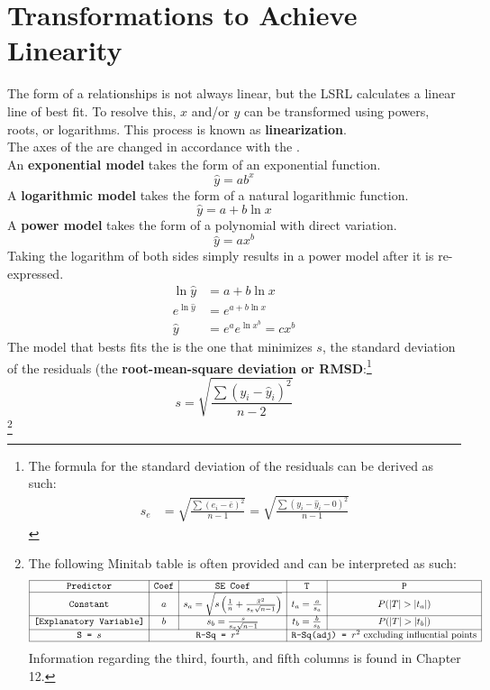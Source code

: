 \documentclass[../AP_Statistics.tex]{subfiles}
\begin{document}
		\section{Transformations to Achieve Linearity}
			The form of a relationships is not always linear, but the LSRL calculates a linear line of best fit. To resolve this, $x$ and/or $y$ can be transformed using powers, roots, or logarithms. This process is known as \textbf{linearization}. \\
			The axes of the  are changed in accordance with the . \\
			An \textbf{exponential model} takes the form of an exponential function.
			\[\hat{y} = ab^x\]
			A \textbf{logarithmic model} takes the form of a natural logarithmic function.
			\[\hat{y} = a + b\ln x\]
			A \textbf{power model} takes the form of a polynomial with direct variation.
			\[\hat{y} = ax^b\]
			Taking the logarithm of both sides simply results in a power model after it is re-expressed.
			\begin{align*}
				\ln \hat{y} &= a + b\ln x \\
				e^{\ln \hat{y}} &= e^{a + b\ln x} \\
				\hat{y} &= e^a e^{\ln x^b} = cx^b
			\end{align*}
			The model that bests fits the  is the one that minimizes $s$, the standard deviation of the residuals (the \textbf{root-mean-square deviation or RMSD}:\footnote{The formula for the standard deviation of the residuals can be derived as such:
				\begin{align*}
					s_e &= \sqrt{\frac{\sum(e_i - \bar{e})^2}{n - 1}} = \sqrt{\frac{\sum(y_i - \hat{y}_i - 0)^2}{n - 1}}
				\end{align*}
			}
			\[s = \sqrt{\frac{\sum(y_i - \hat{y}_i)^2}{n - 2}}\]
			\footnote{
				The following Minitab table is often provided and can be interpreted as such:
				\[\begin{array}{|c|c|c|c|c|}\hline
					\texttt{Predictor} & \texttt{Coef} & \texttt{SE Coef} & \texttt{T} & \texttt{P} \\\hline
					\texttt{Constant} & a & s_a = \sqrt{s\left(\frac{1}{n} + \frac{\bar{x}^2}{s_x\sqrt{n - 1}}\right)} & t_a = \frac{a}{s_a} & P(|T| > |t_a|) \\\hline
					\texttt{[Explanatory Variable]} & b & s_b = \frac{s}{s_x\sqrt{n - 1}} & t_b = \frac{b}{s_b} & P(|T| > |t_b|) \\\hline
					\texttt{S = } s & \multicolumn{2}{c|}{\texttt{R-Sq = } r^2} & \multicolumn{2}{c|}{\texttt{R-Sq(adj) = } r^2 \text{ excluding influential points}} \\\hline
				\end{array}\]
				Information regarding the third, fourth, and fifth columns is found in Chapter 12.
			}
\end{document}
